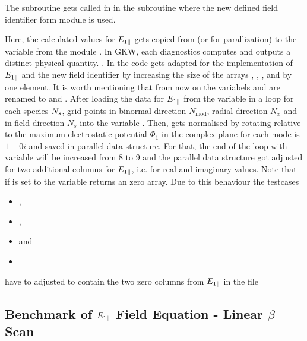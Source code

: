 The subroutine  gets called in  in the subroutine  where the new defined field identifier  form module  is used. 

Here, the calculated values for $E_{1\parallel}$ gets copied from  (or  for parallization) to the variable  from the module . In GKW, each diagnostics computes and outputs a distinct physical quantity. \cite{GKWManual}. In  the code gets adapted for the implementation of $E_{1\parallel}$ and the new field identifier  by increasing the size of the arrays , , ,  and  by one element. It is worth mentioning that from now on the variabels  and  are renamed to  and . After loading the data for $E_{1\parallel}$ from the variable  in a loop for each species $N_s$, grid points in binormal direction $N_\mathrm{mod}$, radial direction $N_x$ and in field direction $N_s$ into the variable . Then,  gets normalised by rotating relative to the maximum electrostatic potential $\Phi_1$ in the complex plane for each mode is $1 + 0i$ and saved in parallel data structure. For that, the end of the loop with variable  will be increased from 8 to 9 and the parallel data structure got adjusted for two additional columns for $E_{1\parallel}$, i.e. for real and imaginary values. Note that if  is set to  the variable  returns an zero array. Due to this behaviour the testcases 
\begin{itemize}
    \item {},
    \item {},
    \item {} and
    \item {}
\end{itemize}
have to adjusted to contain the two zero columns from $E_{1\parallel}$ in the file 

\subsection{Benchmark of $E_{1\parallel}$ Field Equation - Linear $\beta$ Scan}
\label{sub:benchmarkFieldEpar}

